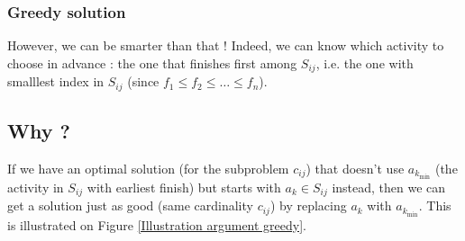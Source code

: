 \subsubsection{Greedy solution}
However, we can be smarter than that ! Indeed, we can know which activity to choose in advance : the one that finishes first among $S_{ij}$, i.e. the one with smalllest index in $S_{ij}$ (since $f_1 \leq f_2 \leq \ldots \leq f_n$).


\subsection*{Why ?}

If we have an optimal solution (for the subproblem $c_{ij}$) that doesn’t use $a_{k_{\text{min}}}$ (the activity in $S_{ij}$ with earliest finish) but starts with $a_k \in S_{ij}$ instead, then we can get a solution just as good (same cardinality $c_{ij}$) by replacing $a_k$ with $a_{k_{\text{min}}}$. This is illustrated on Figure \ref{Illustration argument greedy}.



